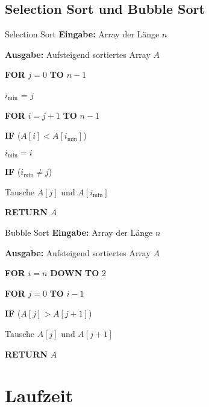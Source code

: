 \documentclass{panikzettel}
\newcommand\tab[1][1cm]{\hspace*{#1}}
\begin{document}
\subsection{Selection Sort und Bubble Sort}

\begin{halfboxl}
	\vspace{-\baselineskip}
	\begin{algo}{Selection Sort}
		\textbf{Eingabe:} Array der Länge $n$
		
		\textbf{Ausgabe:} Aufsteigend sortiertes Array $A$
		\tcblower
		
		\textbf{FOR} $j=0$ \textbf{TO} $n-1$
		
		\tab $i_{\min}$ = $j$
		
		\tab \textbf{FOR} $i = j + 1 $ \textbf{TO} $n-1$
		
		\tab\tab \textbf{IF} ($A[i] < A[i_{\min}]$)
		
		\tab\tab\tab $i_{\min} = i$
		
		\tab \textbf{IF} ($i_{\min} \neq j$)
		
		\tab\tab Tausche $A[j]$ und $A[i_{\min}]$
		
		\textbf{RETURN} $A$
	\end{algo}
\end{halfboxl}%
\begin{halfboxr}
	\vspace{-\baselineskip}
	\begin{algo}{Bubble Sort}
		\textbf{Eingabe:} Array der Länge $n$
		
		\textbf{Ausgabe:} Aufsteigend sortiertes Array $A$
		\tcblower
		
		\textbf{FOR} $i = n$ \textbf{DOWN}\footnotemark \textbf{ TO} $2$
		
		\tab \textbf{FOR} $j = 0$ \textbf{TO} $i-1$
		
		\tab\tab \textbf{IF} ($A[j] > A[j+1]$)
		
		\tab\tab\tab Tausche $A[j]$ und $A[j+1]$
		
		\textbf{RETURN} $A$
	\end{algo}
\end{halfboxr}



\newpage
\section{Laufzeit}
\end{document}
